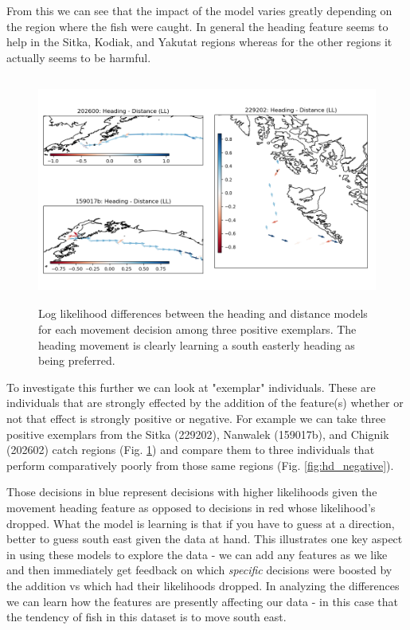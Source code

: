\documentclass[11pt]{article}
\begin{document}
From this we can see that the impact of the model varies greatly depending on the region where the fish were caught. In general the heading feature seems to help in the Sitka, Kodiak, and Yakutat regions whereas for the other regions it actually seems to be harmful. 

\begin{figure}[h!] 
	\centering
  \includegraphics[height=75mm]{figures/hd_positive.png}
  \caption{Log likelihood differences between the heading and distance models for each movement decision among three positive exemplars. The heading movement is clearly learning a south easterly heading as being preferred.}
  \label{fig:hd_positive}
\end{figure}

To investigate this further we can look at "exemplar" individuals. These are individuals that are strongly effected by the addition of the feature(s) whether or not that effect is strongly positive or negative. For example we can take three positive exemplars from the Sitka (229202), Nanwalek (159017b), and Chignik (202602) catch regions (Fig. \ref{fig:hd_positive}) and compare them to three individuals that perform comparatively poorly from those same regions (Fig. \ref{fig:hd_negative}). 

Those decisions in blue represent decisions with higher likelihoods given the movement heading feature as opposed to decisions in red whose likelihood's dropped. What the model is learning is that if you have to guess at a direction, better to guess south east given the data at hand. This illustrates one key aspect in using these models to explore the data - we can add any features as we like and then immediately get feedback on which \textit{specific} decisions were boosted by the addition vs which had their likelihoods dropped. In analyzing the differences we can learn how the features are presently affecting our data - in this case that the tendency of fish in this dataset is to move south east. 
\end{document}
